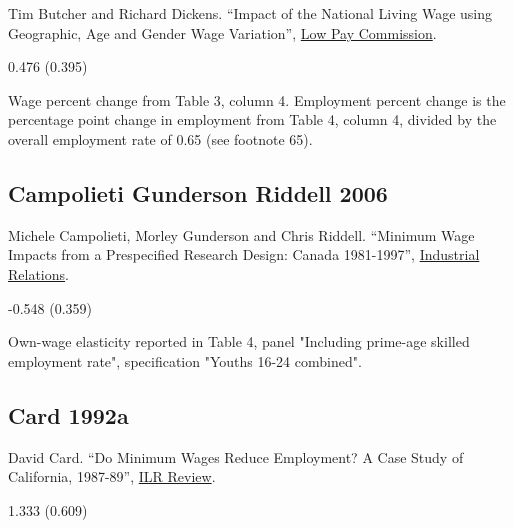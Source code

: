 \noindent Tim Butcher and Richard Dickens. ``Impact of the National Living Wage using Geographic, Age and Gender Wage Variation'', \href{https://www.gov.uk/government/publications/national-living-wage-impacts-by-geography-age-and-gender}{Low Pay Commission}.

\vspace{0.7em}

 0.476 (0.395)

\vspace{0.7em}

 Wage percent change from Table 3, column 4. Employment percent change is the percentage point change in employment from Table 4, column 4, divided by the overall employment rate of 0.65 (see footnote 65).

\subsection*{Campolieti Gunderson Riddell 2006}
\vspace{-0.7em}

\noindent Michele Campolieti, Morley Gunderson and Chris Riddell. ``Minimum Wage Impacts from a Prespecified Research Design: Canada 1981-1997'', \href{https://doi.org/10.1111/j.1468-232X.2006.00424.x}{Industrial Relations}.

\vspace{0.7em}

 -0.548 (0.359)

\vspace{0.7em}

 Own-wage elasticity reported in Table 4, panel "Including prime-age skilled employment rate", specification "Youths 16-24 combined".

\subsection*{Card 1992a}
\vspace{-0.7em}

\noindent David Card. ``Do Minimum Wages Reduce Employment? A Case Study of California, 1987-89'', \href{https://doi.org/10.1177/001979399204600104}{ILR Review}.

\vspace{0.7em}

 1.333 (0.609)


